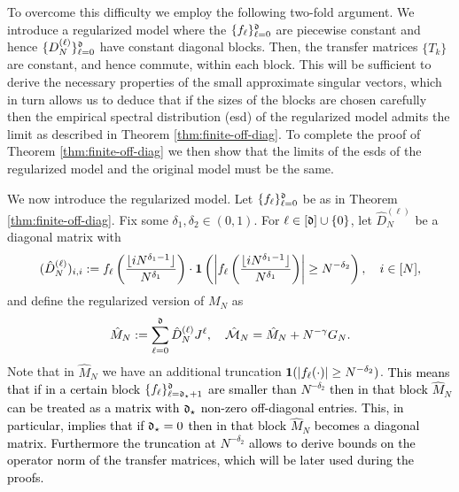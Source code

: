 \documentclass{amsart}
\numberwithin{equation}{section}
\def\corEE{\textcolor{amethyst}}
\def\corEE{}
\def\corAB{}
\def\corABrev{\textcolor{black}}
\newcommand{\abbr}[1]{{\sc\lowercase{#1}}}
\begin{document}
To overcome this difficulty we employ the following two-fold argument.
We introduce a regularized model where the
$\{f_\ell\}_{\ell=0}^{\mathfrak{d}}$ are piecewise constant
and hence $\{D_N^{(\ell)}\}_{\ell=0}^{\mathfrak{d}}$ have constant diagonal blocks.
Then,
the transfer matrices $\{T_k\}$ are constant, and hence commute,
within each block.
This will be sufficient to derive the necessary properties of
the small approximate singular vectors,
which in turn allows us to deduce that
if the size\corEE{s} of the blocks are chosen carefully then
the \corAB{empirical spectral distribution (\abbr{ESD})} of the regularized model admits the limit as
described in Theorem \ref{thm:finite-off-diag}. To complete the proof of Theorem \ref{thm:finite-off-diag} we then show that the limits of the \abbr{ESD}s of the regularized model and the original model must be the same.



We now introduce the regularized model.
Let $\{f_\ell\}_{\ell=0}^{\mathfrak{d}}$ be as in Theorem \ref{thm:finite-off-diag}.
Fix some $\delta_1, \delta_2 \in(0,1)$. For $\ell \in [\mathfrak{d}]\cup\{0\}$,
let $\hat{D}_N^{(\ell)}$ be a diagonal matrix with
$$(\hat{D}_N^{(\ell)})_{i,i}:=f_\ell\left(\frac{\lfloor i N^{\delta_1-1}\rfloor}{N^{\delta_1}}\right)\cdot {\bf 1}\left(\left|f_\ell\left(\frac{\lfloor i N^{\delta_1-1}\rfloor}{N^{\delta_1}}\right)\right| \ge N^{-\delta_2}\right), \quad {i \in [N]},$$
and define the regularized version of $M_N$ as
\begin{equation}
  \label{eq-regularized}
\hat{M}_N:=\sum_{\ell=0}^{\mathfrak{d}} \hat{D}_N^{(\ell)} J^\ell,
\quad \hat{\mathcal{M}}_N=\hat M_N+N^{-\gamma} G_N.
\end{equation}
Note that in $\hat{M}_N$  we have an additional truncation ${\bf 1}( |f_\ell (\cdot)| \ge N^{-\delta_2})$. \corABrev{This means that if in a certain block $\{f_\ell\}_{\ell=\mathfrak{d}_\star+1}^{\mathfrak{d}}$ are smaller than $N^{-\delta_2}$ then in that block $\hat{M}_N$ can be treated as a matrix with $\mathfrak{d}_\star$ non-zero off-diagonal entries. This, in particular, implies that if $\mathfrak{d}_\star=0$ then in that block $\hat M_N$ becomes a diagonal matrix. Furthermore the truncation at $N^{-\delta_2}$ allows to derive bounds on the operator norm of the transfer matrices, which will be later used during the proofs.}
\end{document}

